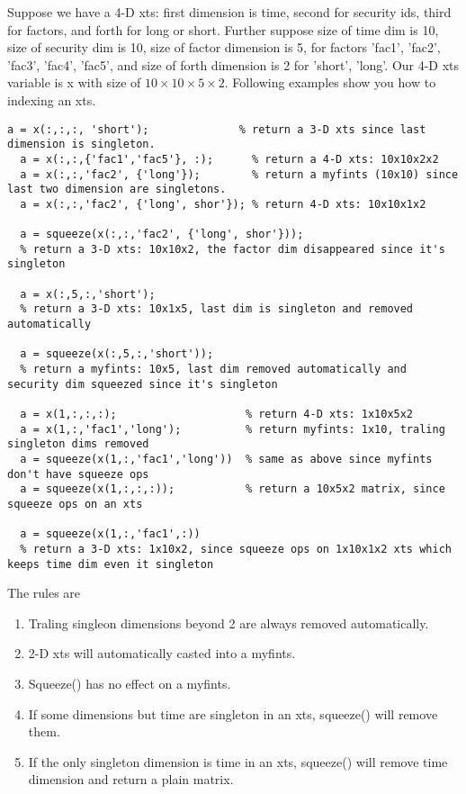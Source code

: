 Suppose we have a 4-D xts: first dimension is time, second for security ids, third for factors, and forth for long or short.
Further suppose size of time dim is 10, size of security dim is 10, size of factor dimension is 5, for factors {'fac1', 'fac2', 'fac3', 'fac4', 'fac5'}, and size of forth dimension is 2 for {'short', 'long'}. Our 4-D xts variable is x with size of $10\times10\times5\times2$.
Following examples show you how to indexing an xts.
\begin{lstlisting}[numbers=none]
  a = x(:,:,:, 'short');              % return a 3-D xts since last dimension is singleton.
  a = x(:,:,{'fac1','fac5'}, :);      % return a 4-D xts: 10x10x2x2
  a = x(:,:,'fac2', {'long'});        % return a myfints (10x10) since last two dimension are singletons. 
  a = x(:,:,'fac2', {'long', shor'}); % return 4-D xts: 10x10x1x2

  a = squeeze(x(:,:,'fac2', {'long', shor'}));
  % return a 3-D xts: 10x10x2, the factor dim disappeared since it's singleton

  a = x(:,5,:,'short');          
  % return a 3-D xts: 10x1x5, last dim is singleton and removed automatically

  a = squeeze(x(:,5,:,'short'));
  % return a myfints: 10x5, last dim removed automatically and security dim squeezed since it's singleton

  a = x(1,:,:,:);                    % return 4-D xts: 1x10x5x2
  a = x(1,:,'fac1','long');          % return myfints: 1x10, traling singleton dims removed 
  a = squeeze(x(1,:,'fac1','long'))  % same as above since myfints don't have squeeze ops
  a = squeeze(x(1,:,:,:));           % return a 10x5x2 matrix, since squeeze ops on an xts

  a = squeeze(x(1,:,'fac1',:))      
  % return a 3-D xts: 1x10x2, since squeeze ops on 1x10x1x2 xts which keeps time dim even it singleton
\end{lstlisting}

The rules are
\begin{enumerate}
   \item Traling singleon dimensions beyond 2 are always removed automatically.
   \item 2-D xts will automatically casted into a myfints.
   \item Squeeze() has no effect on a myfints.
   \item If some dimensions but time are singleton in an xts, squeeze() will remove them.
   \item If the only singleton dimension is time in an xts, squeeze() will remove time dimension and return a plain matrix. 
\end{enumerate}

